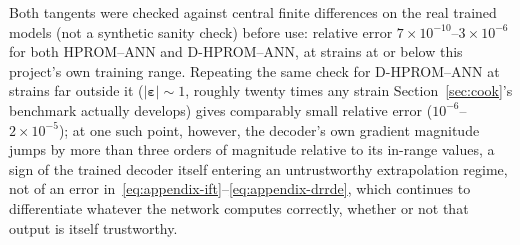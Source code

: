 \documentclass[10pt,a4paper]{article}
\begin{document}
Both tangents were checked against central finite differences on the real
trained models (not a synthetic sanity check) before use: relative error
$7\times10^{-10}$--$3\times10^{-6}$ for both HPROM--ANN and D-HPROM--ANN,
at strains at or below this project's own training range. Repeating the
same check for D-HPROM--ANN at strains far outside it ($|\bm\varepsilon|\sim
1$, roughly twenty times any strain Section~\ref{sec:cook}'s benchmark
actually develops) gives comparably small relative error
($10^{-6}$--$2\times10^{-5}$); at one such point, however, the decoder's
own gradient magnitude jumps by more than three orders of magnitude
relative to its in-range values, a sign of the trained decoder itself
entering an untrustworthy extrapolation regime, not of an error
in~\eqref{eq:appendix-ift}--\eqref{eq:appendix-drrde}, which continues to
differentiate whatever the network computes correctly, whether or not that
output is itself trustworthy.
\end{document}
